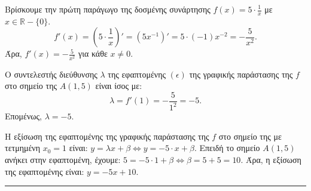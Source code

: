 \begin{alist}
\item Βρίσκουμε την πρώτη παράγωγο της δοσμένης συνάρτησης $f(x) = 5 \cdot \frac{1}{x}$ με $x \in \mathbb{R} - \{0\}$.
\[
f'(x) = \left(5 \cdot \frac{1}{x}\right)' = (5x^{-1})' = 5 \cdot (-1)x^{-2} = -\frac{5}{x^2}.
\]
Άρα, $f'(x) = -\frac{5}{x^2}$ για κάθε $x \neq 0$.
\item Ο συντελεστής διεύθυνσης $\lambda$ της εφαπτομένης $(\epsilon)$ της γραφικής παράστασης της $f$ στο σημείο της $A(1,5)$ είναι ίσος με:
\[
\lambda = f'(1) = -\frac{5}{1^2} = -5.
\]
Επομένως, $\lambda = -5$.
\item Η εξίσωση της εφαπτομένης της γραφικής παράστασης της $f$ στο σημείο της με τετμημένη $x_0 = 1$ είναι:
$y = \lambda x + \beta \Leftrightarrow y = -5 \cdot x + \beta$.
Επειδή το σημείο $A(1,5)$ ανήκει στην εφαπτομένη, έχουμε:
$5 = -5 \cdot 1 + \beta \Leftrightarrow \beta = 5 + 5 = 10$.
Άρα, η εξίσωση της εφαπτομένης είναι: $y = -5x + 10$.
\end{alist}
\vspace{6mm}
\noindent\rule{\textwidth}{0.4pt}
\vspace{6mm}

